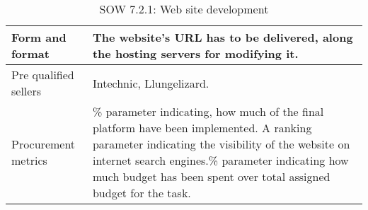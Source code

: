 \begin{table}[H]
\begin{tabular}{>{\raggedright\arraybackslash}p{3cm} >{\arraybackslash}p{11cm}}
		\midrule
		
		Form and format & The website's URL has to be delivered, along the hosting servers for modifying it.\vspace{0.2cm} \\
		
		\midrule
		
		Pre qualified sellers & Intechnic, Llungelizard.\vspace{0.2cm} \\
		
		\midrule
		
		Procurement metrics & \% parameter indicating, how much of the final platform have been implemented. A ranking parameter indicating the visibility of the website on internet search engines.\% parameter indicating how much budget has been spent over total assigned budget for the task.\vspace{0.2cm} \\
		
		\bottomrule[2pt]		
		
	\end{tabular}
	\caption{SOW 7.2.1: Web site development}
\end{table}


